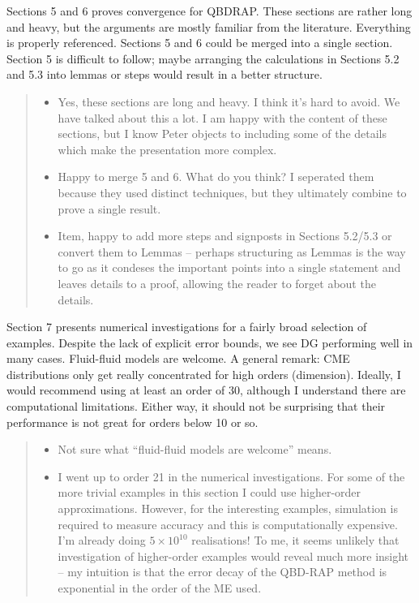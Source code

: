 \documentclass[a4paper]{article}
\begin{document}
Sections 5 and 6 proves convergence for QBDRAP. These sections are rather long and heavy, but the arguments are mostly familiar from the literature. Everything is properly referenced. Sections 5 and 6 could be merged into a single section. Section 5 is difficult to follow; maybe arranging the calculations in Sections 5.2 and 5.3 into lemmas or steps would result in a better structure.
\begin{quote}
    \begin{itemize}
        \item Yes, these sections are long and heavy. I think it's hard to avoid. We have talked about this a lot. I am happy with the content of these sections, but I know Peter objects to including some of the details which make the presentation more complex. 
        \item Happy to merge 5 and 6. What do you think? I seperated them because they used distinct techniques, but they ultimately combine to prove a single result. 
        \item Item, happy to add more steps and signposts in Sections 5.2/5.3 or convert them to Lemmas -- perhaps structuring as Lemmas is the way to go as it condeses the important points into a single statement and leaves details to a proof, allowing the reader to forget about the details.
    \end{itemize}
\end{quote}

Section 7 presents numerical investigations for a fairly broad selection of examples. Despite the lack of explicit error bounds, we see DG performing well in many cases. Fluid-fluid models are welcome. A general remark: CME distributions only get really concentrated for high orders (dimension). Ideally, I would recommend using at least an order of 30, although I understand there are computational limitations. Either way, it should not be surprising that their performance is not great for orders below 10 or so.
\begin{quote}
    \begin{itemize}
        \item   Not sure what ``fluid-fluid models are welcome'' means.
        \item I went up to order 21 in the numerical investigations. For some of the more trivial examples in this section I could use higher-order approximations. However, for the interesting examples, simulation is required to measure accuracy and this is computationally expensive. I'm already doing \(5\times 10^{10}\) realisations! To me, it seems unlikely that investigation of higher-order examples would reveal much more insight -- my intuition is that the error decay of the QBD-RAP method is exponential in the order of the ME used. 
    \end{itemize}
\end{quote}
\end{document}
